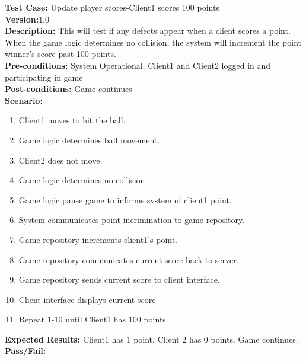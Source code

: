 \noindent \textbf{Test Case:} Update player scores-Client1 scores 100 points\\
\textbf{Version:}1.0\\
\textbf{Description:} This will test if any defects appear when a client scores a point.  When the game logic determines no collision, the system will increment the point winner's score past 100 points.\\
\textbf{Pre-conditions:} System Operational, Client1 and Client2 logged in and participating in game \\
\textbf{Post-conditions:} Game continues\\
\textbf{Scenario:}
\begin{enumerate}
\item Client1 moves to hit the ball.
\item Game logic determines ball movement.
\item Client2 does not move 
\item Game logic determines no collision. 
\item Game logic pause game to informs system of client1 point.
\item System communicates point incrimination to game repository.
\item Game repository increments client1’s point.
\item Game repository communicates current score back to server.
\item Game repository sends current score to client interface.
\item Client interface displays current score
\item Repeat 1-10 until Client1 has 100 points.
\end{enumerate}
\textbf{Expected Results:} Client1 has 1 point, Client 2 has 0 points.  Game continues.\\
\textbf{Pass/Fail:}

